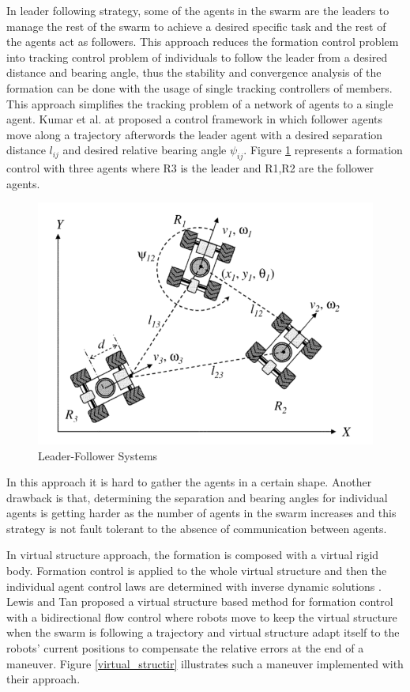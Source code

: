 In leader following strategy, some of the agents in the swarm are the leaders to manage the rest of the swarm to achieve a desired specific task and the rest of the agents act as followers. This approach reduces the formation control problem into tracking control problem of individuals to follow the leader from a desired distance and bearing angle, thus the stability and convergence analysis of the formation can be done with the usage of single tracking controllers of members. This approach simplifies the tracking problem of a network of agents to a single agent. Kumar et al. at \cite{18} proposed a control framework in which follower agents move along a trajectory afterwords the leader agent with a desired separation distance $l_{ij}$ and desired relative bearing angle $\psi_{ij}$.  Figure \ref{leader_follower_ref} represents a formation control with three agents where R3 is the leader and R1,R2 are the follower agents. 

\begin{figure}[H]
	\caption{Leader-Follower Systems \cite{18}} \label{leader_follower_ref}
	\centering
	\includegraphics[scale = 0.5]{leader}
\end{figure}


In this approach it is hard to gather the agents in a certain shape. Another drawback is that, determining the separation and bearing angles for individual agents is getting harder as the number of agents in the swarm increases and this strategy is not fault tolerant to the absence of communication between agents.


In virtual structure approach, the formation is composed with a virtual rigid body. Formation control is applied to the whole virtual structure and then the individual agent control laws are determined with inverse dynamic solutions \cite{12}.  Lewis and Tan \cite{23} proposed a virtual structure based method for formation control  with a bidirectional flow control where robots move to keep the virtual structure when the swarm is following a trajectory and virtual structure adapt itself to the robots' current positions to compensate the relative errors at the end of a maneuver. Figure \ref{virtual_structir} illustrates such a maneuver implemented with their approach.

